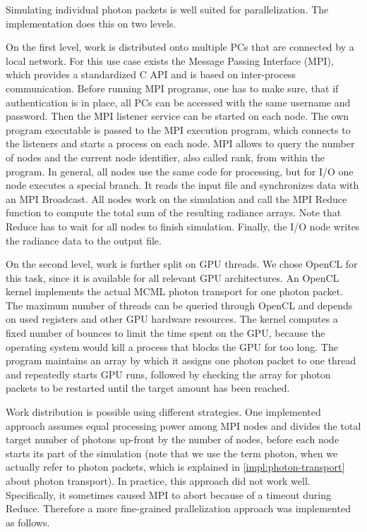 \documentclass[]{article}
\begin{document}
Simulating individual photon packets is well suited for parallelization. The implementation does this on two levels.

On the first level, work is distributed onto multiple PCs that are connected by a local network. For this use case exists the Message Passing Interface (MPI), which provides a standardized C API and is based on inter-process communication. Before running MPI programs, one has to make sure, that if authentication is in place, all PCs can be accessed with the same username and password. Then the MPI listener service can be started on each node. The own program executable is passed to the MPI execution program, which connects to the listeners and starts a process on each node. MPI allows to query the number of nodes and the current node identifier, also called rank, from within the program. In general, all nodes use the same code for processing, but for I/O one node executes a special branch. It reads the input file and synchronizes data with an MPI Broadcast. All nodes work on the simulation and call the MPI Reduce function to compute the total sum of the resulting radiance arrays. Note that Reduce has to wait for all nodes to finish simulation. Finally, the I/O node writes the radiance data to the output file.

On the second level, work is further split on GPU threads. We chose OpenCL for this task, since it is available for all relevant GPU architectures. An OpenCL kernel implements the actual MCML photon transport for one photon packet. The maximum number of threads can be queried through OpenCL and depends on used registers and other GPU hardware resources. The kernel computes a fixed number of bounces to limit the time spent on the GPU, because the operating system would kill a process that blocks the GPU for too long. The program maintains an array by which it assigns one photon packet to one thread and repeatedly starts GPU runs, followed by checking the array for photon packets to be restarted until the target amount has been reached.

Work distribution is possible using different strategies. One implemented approach assumes equal processing power among MPI nodes and divides the total target number of photons up-front by the number of nodes, before each node starts its part of the simulation (note that we use the term photon, when we actually refer to photon packets, which is explained in \autoref{impl:photon-transport} about photon transport). In practice, this approach did not work well. Specifically, it sometimes caused MPI to abort because of a timeout during Reduce. Therefore a more fine-grained prallelization approach was implemented as follows.
\end{document}
